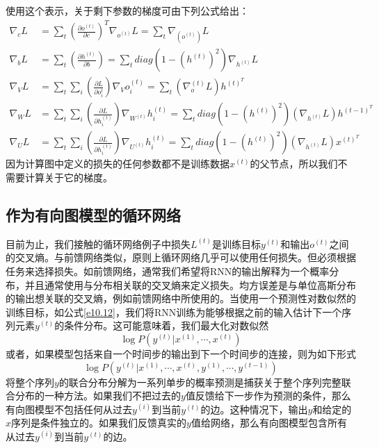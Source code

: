 \documentclass{ctexart}
\begin{document}
            使用这个表示，关于剩下参数的梯度可由下列公式给出：
            \begin{align}
                    \nabla_c L &= \sum_t (\frac{\partial o^{(t)}}{\partial c})^T \nabla_{o^{(t)}} L = \sum_t \nabla_{(o^{(t)})} L \\
                    \nabla_b L &= \sum_t (\frac{\partial h^{(t)}}{\partial b}) = \sum_{t} diag(1-(h^{(t)})^2) \nabla_{h^{(t)}} L \\
                    \nabla_V L &= \sum_t\sum_i(\frac{\partial L}{\partial o_i^{t}}) \nabla_V o_i^{(t)} = \sum_t (\nabla_o^{(t)}L)h^{(t)^T} \\
                    \nabla_W L & = \sum_t\sum_i(\frac{\partial L}{\partial h_i^{(t)}})\nabla_{W^{(t)}} h_i^{(t)}=\sum_t diag(1-(h^{(t)})^2)(\nabla_{h^{(t)}}L)h^{(t-1)^T} \\
                    \nabla_U L &= \sum_t\sum_i (\frac{\partial L}{\partial h_i^{(t)}})\nabla_{U^{(t)}}h_i^{(t)} = \sum_t diag(1-(h^{(t)})^2) (\nabla_{h^{(t)}}L)x^{(t)^T}
            \end{align}
            因为计算图中定义的损失的任何参数都不是训练数据$x^{(t)}$的父节点，所以我们不需要计算关于它的梯度。

        \subsection{作为有向图模型的循环网络}
            目前为止，我们接触的循环网络例子中损失$L^{(t)}$是训练目标$y^{(t)}$和输出$o^{(t)}$之间的交叉熵。与前馈网络类似，原则上循环网络几乎可以使用任何损失。但必须根据任务来选择损失。如前馈网络，通常我们希望将RNN的输出解释为一个概率分布，并且通常使用与分布相关联的交叉熵来定义损失。均方误差是与单位高斯分布的输出想关联的交叉熵，例如前馈网络中所使用的。当使用一个预测性对数似然的训练目标，如公式\ref{e10.12}，我们将RNN训练为能够根据之前的输入估计下一个序列元素$y^{(t)}$的条件分布。这可能意味着，我们最大化对数似然
            \begin{equation}
                \log P(y^{(t)}|x^{(1)},\cdots,x^{(t)})
                \label{e10.29}
            \end{equation}
            或者，如果模型包括来自一个时间步的输出到下一个时间步的连接，则为如下形式
            \begin{equation}
                \log P(y^{(t)}|x^{(1)},\cdots,x^{(t)},y^{(1)},\cdots,y^{(t-1)})
                \label{e10.30}
            \end{equation}
            将整个序列$y$的联合分布分解为一系列单步的概率预测是捕获关于整个序列完整联合分布的一种方法。如果我们不把过去的$y$值反馈给下一步作为预测的条件，那么有向图模型不包括任何从过去$y^{(i)}$到当前$y^{(t)}$的边。这种情况下，输出$y$和给定的$x$序列是条件独立的。如果我们反馈真实的$y$值给网络，那么有向图模型包含所有从过去$y^{(i)}$到当前$y^{(t)}$的边。
\end{document}
